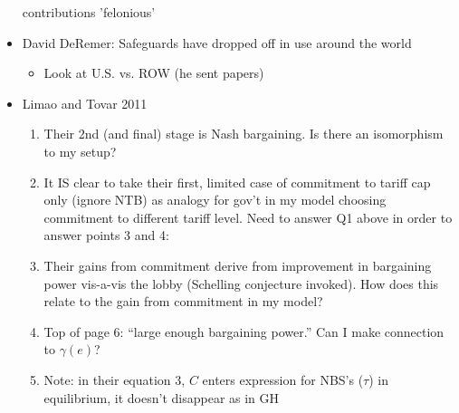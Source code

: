 \documentclass[12pt]{article}
\newcommand{\ga}{\gamma}
\begin{document}
\begin{itemize}
	 contributions 'felonious'
	\item David DeRemer: Safeguards have dropped off in use around the world
		\begin{itemize}
			\item Look at U.S. vs. ROW (he sent papers)
		\end{itemize}
	\item Limao and Tovar 2011
		\begin{enumerate}
			\item Their 2nd (and final) stage is Nash bargaining. Is there an isomorphism to my setup?
			\item It IS clear to take their first, limited case of commitment to tariff cap only (ignore NTB) as analogy for gov't in my model choosing commitment to different tariff level. Need to answer Q1 above in order to answer points 3 and 4:
			\item Their gains from commitment derive from improvement in bargaining power vis-a-vis the lobby (Schelling conjecture invoked). How does this relate to the gain from commitment in my model?
			\item Top of page 6: ``large enough bargaining power.'' Can I make connection to $\ga(e)$?
			\item Note: in their equation 3, $C$ enters expression for NBS's ($\tau$) in equilibrium, it doesn't disappear as in GH
		\end{enumerate}
\end{itemize}
\end{document}
